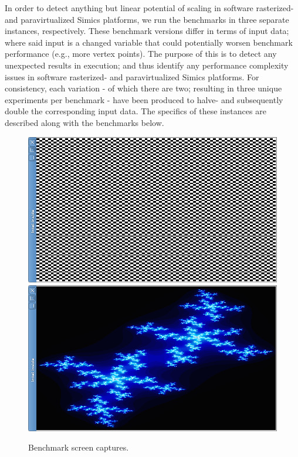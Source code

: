 In order to detect anything but linear potential of scaling in software rasterized- and paravirtualized Simics platforms,  we run the benchmarks in three separate instances, respectively.
These benchmark versions differ in terms of input data; where said input is a changed variable that could potentially worsen benchmark performance (e.g., more vertex points).
The purpose of this is to detect any unexpected results in execution; and thus identify any performance complexity issues in software rasterized- and paravirtualized Simics platforms.
For consistency, each variation - of which there are two; resulting in three unique experiments per benchmark - have been produced to halve- and subsequently double the corresponding input data.
The specifics of these instances are described along with the benchmarks below.

\begin{figure}
  \minipage{\linewidth}
  \includegraphics[width=\linewidth]{img/imgchess.png}
  \endminipage\\[6pt]
  \minipage{\linewidth}
  \includegraphics[width=\linewidth]{img/imgjulia.png}
  \caption[Benchmark screen captures]{Benchmark screen captures.}
  \label{fig:benchmarks}
  \endminipage
\end{figure}

